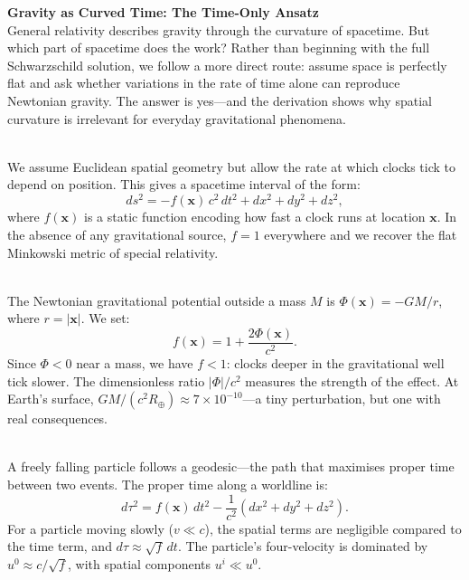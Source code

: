 \begin{technical}
{\Large\textbf{Gravity as Curved Time: The Time-Only Ansatz}}\\[0.3em]

General relativity describes gravity through the curvature of spacetime. But which part of spacetime does the work? Rather than beginning with the full Schwarzschild solution, we follow a more direct route: assume space is perfectly flat and ask whether variations in the rate of time alone can reproduce Newtonian gravity. The answer is yes—and the derivation shows why spatial curvature is irrelevant for everyday gravitational phenomena.

\\[0.5em]
We assume Euclidean spatial geometry but allow the rate at which clocks tick to depend on position. This gives a spacetime interval of the form:
\begin{equation*}
ds^2 = -f(\mathbf{x})\, c^2\, dt^2 + dx^2 + dy^2 + dz^2,
\end{equation*}
where \( f(\mathbf{x}) \) is a static function encoding how fast a clock runs at location \(\mathbf{x}\). In the absence of any gravitational source, \( f = 1 \) everywhere and we recover the flat Minkowski metric of special relativity.

\vspace{0.5em}
\\[0.5em]
The Newtonian gravitational potential outside a mass \( M \) is \( \Phi(\mathbf{x}) = -GM/r \), where \( r = |\mathbf{x}| \). We set:
\begin{equation*}
f(\mathbf{x}) = 1 + \frac{2\Phi(\mathbf{x})}{c^2}.
\end{equation*}
Since \( \Phi < 0 \) near a mass, we have \( f < 1 \): clocks deeper in the gravitational well tick slower. The dimensionless ratio \( |\Phi|/c^2 \) measures the strength of the effect. At Earth's surface, \( GM/(c^2 R_\oplus) \approx 7 \times 10^{-10} \)—a tiny perturbation, but one with real consequences.

\vspace{0.5em}
\\[0.5em]
A freely falling particle follows a geodesic—the path that maximises proper time between two events. The proper time along a worldline is:
\begin{equation*}
d\tau^2 = f(\mathbf{x})\, dt^2 - \frac{1}{c^2}(dx^2 + dy^2 + dz^2).
\end{equation*}
For a particle moving slowly (\( v \ll c \)), the spatial terms are negligible compared to the time term, and \( d\tau \approx \sqrt{f}\, dt \). The particle's four-velocity is dominated by \( u^0 \approx c/\sqrt{f} \), with spatial components \( u^i \ll u^0 \).


\end{technical}
